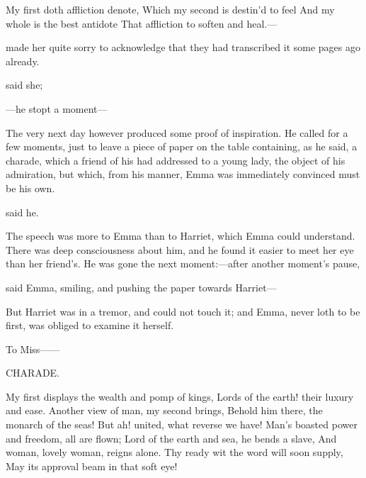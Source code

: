 My first doth affliction denote,\crlf
Which my second is destin'd to feel\crlf
And my whole is the best antidote\crlf
That affliction to soften and heal.---

made her quite sorry to acknowledge that they had transcribed it some pages ago already.

 said she; 

---he stopt a moment---

The very next day however produced some proof of inspiration. He called for a few moments, just to leave a piece of paper on the table containing, as he said, a charade, which a friend of his had addressed to a young lady, the object of his admiration, but which, from his manner, Emma was immediately convinced must be his own.

 said he. 

The speech was more to Emma than to Harriet, which Emma could understand. There was deep consciousness about him, and he found it easier to meet her eye than her friend's. He was gone the next moment:---after another moment's pause,

 said Emma, smiling, and pushing the paper towards Harriet---

But Harriet was in a tremor, and could not touch it; and Emma, never loth to be first, was obliged to examine it herself.

To Miss------

CHARADE.

My first displays the wealth and pomp of kings,\crlf
Lords of the earth! their luxury and ease.\crlf
Another view of man, my second brings,\crlf
Behold him there, the monarch of the seas!\crlf
\crlf
But ah! united, what reverse we have!\crlf
Man's boasted power and freedom, all are flown;\crlf
Lord of the earth and sea, he bends a slave,\crlf
And woman, lovely woman, reigns alone.\crlf
\crlf
Thy ready wit the word will soon supply,\crlf
May its approval beam in that soft eye!

